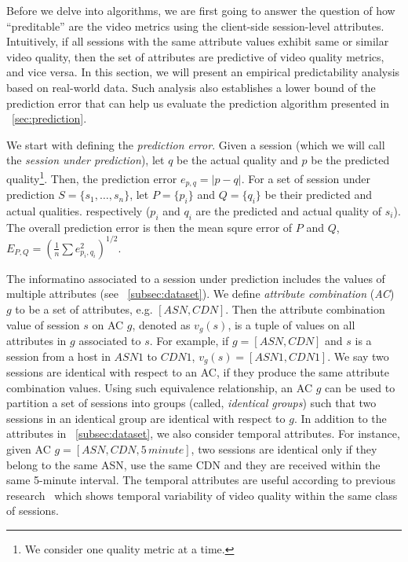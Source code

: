 Before we delve into algorithms, we are first going to answer the question of how ``preditable'' are the video metrics using the client-side session-level attributes. Intuitively, if all sessions with the same attribute values exhibit same or similar video quality, then the set of attributes are predictive of video quality metrics, and vice versa. In this section, we will present an empirical predictability analysis based on real-world data. Such analysis also establishes a lower bound of the prediction error that can help us evaluate the prediction algorithm presented in \Section~\ref{sec:prediction}.

\label{subsec:definitions}



 We start with defining the {\it prediction error}.  Given a session
(which we will call the {\it session under prediction}), let $q$ be
the actual quality and $p$ be the predicted quality\footnote{We consider one quality metric at a time.}. Then, the
prediction error $e_{p,q}=|p-q|$.
For a set of session under prediction $S=\{s_1,\dots,s_n\}$, let $P=\{p_i\}$ and $Q=\{q_i\}$ be their predicted and actual qualities. respectively ($p_i$ and $q_i$ are the predicted and actual quality of $s_i$). The overall prediction error is then the mean squre error of $P$ and $Q$, $E_{P,Q}=\left(\frac{1}{n}\sum e_{p_i,q_i}^2\right)^{1/2}$.

 The informatino associated to a session under prediction includes the values of multiple attributes (see \Section~\ref{subsec:dataset}). We define {\it attribute combination} ({\it AC}) $g$ to be a set of attributes, e.g. $[ASN, CDN]$. Then the attribute combination value of session $s$ on AC $g$, denoted as $v_g(s)$, is a tuple of values on all attributes in $g$ associated to $s$. For example, if $g=[ASN,CDN]$ and $s$ is a session from a host in $ASN1$ to $CDN1$, $v_g(s)=[ASN1, CDN1]$. We say two sessions are identical with respect to an AC, if they produce the same attribute combination values. Using such equivalence relationship, an AC $g$ can be used to partition a set of sessions into groups (called, {\it identical groups}) such that two sessions in an identical group are identical with respect to $g$.
In addition to the attributes in \Section~\ref{subsec:dataset}, we also consider temporal attributes. For instance, given AC $g=[ASN, CDN, 5\,minute]$, two sessions are identical only if they belong to the same ASN, use the same CDN and they are received within the same 5-minute interval. The temporal attributes are useful according to previous research~\cite{sigcomm2012} which shows temporal variability of video quality within the same class of sessions.


